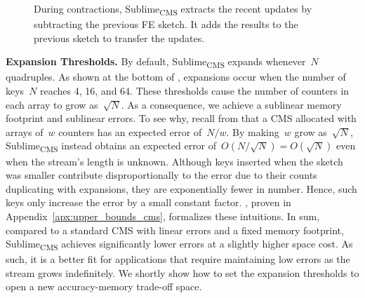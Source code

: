 \documentclass[sigconf]{acmart}
\newcommand{\sketch}{Sublime}
\newcommand{\sketchcms}{\sketch\textsubscript{CMS}\xspace}
\begin{document}
\begin{figure}
    \caption{During contractions, \sketchcms extracts the recent updates by
    subtracting the previous FE sketch. It adds the results to the previous
    sketch to transfer the updates.}
    \label{fig:contraction}
\end{figure}
\fi

\textbf{Expansion Thresholds.} 
By default, \sketchcms expands whenever~$N$ quadruples. As shown at the bottom of , expansions occur when the number of keys~$N$ reaches 4, 16, and 64.
These thresholds cause the number of counters in each array to grow as~$\sqrt{N}$.
As a consequence, we achieve a sublinear memory footprint and sublinear errors.
To see why, recall from  that a CMS allocated with arrays of~$w$ counters has an expected error of~$N/w$.
By making~$w$ grow as~$\sqrt{N}$, \sketchcms instead obtains an expected error of~$O(N/\sqrt{N})=O(\sqrt{N})$ even when the stream's length is unknown. 
Although keys inserted when the sketch was smaller contribute disproportionally to the error due to their counts duplicating with expansions, they are exponentially fewer in number.
Hence, such keys only increase the error by a small constant factor.
, proven in Appendix~\ref{apx:upper_bounds_cms}, formalizes these intuitions.
In sum, compared to a standard CMS with linear errors and a fixed memory footprint, \sketchcms achieves significantly lower errors at a slightly higher space cost.
As such, it is a better fit for applications that require maintaining low errors as the stream grows indefinitely.
We shortly show how to set the expansion thresholds to open a new accuracy-memory trade-off space.
\end{document}
